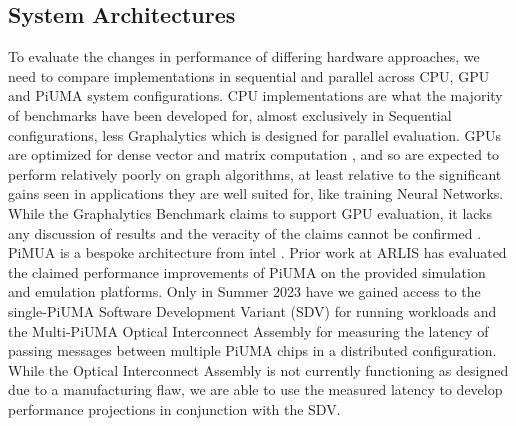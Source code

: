 \documentclass[letterpaper, 10pt]{article}
\begin{document}
\begin{multicols}{2}
{        \subsection{System Architectures}\label{section:architecutres}
        To evaluate the changes in performance of differing hardware approaches, we need to compare implementations in sequential and parallel across CPU, GPU and PiUMA system configurations. 
        CPU implementations are what the majority of benchmarks have been developed for, almost exclusively in Sequential configurations, less Graphalytics \cite{Capota2015} which is designed for parallel evaluation. 
        GPUs are optimized for dense vector and matrix computation \cite{Dally2021}, and so are expected to perform relatively poorly on graph algorithms, at least relative to the significant gains seen in applications they are well suited for, like training Neural Networks. While the Graphalytics Benchmark claims to support GPU evaluation, it lacks any discussion of results and the veracity of the claims cannot be confirmed \cite{Capota2015}.
        PiMUA is a bespoke architecture from intel \cite{Aananthakrishnan2020}. 
        Prior work at ARLIS has evaluated the claimed performance improvements of PiUMA on the provided simulation and emulation platforms. 
        Only in Summer 2023 have we gained access to the single-PiUMA Software Development Variant (SDV) for running workloads and the Multi-PiUMA Optical Interconnect Assembly for measuring the latency of passing messages between multiple PiUMA chips in a distributed configuration. 
        While the Optical Interconnect Assembly is not currently functioning as designed due to a manufacturing flaw, we are able to use the measured latency to develop performance projections in conjunction with the SDV. 
        
}
\end{multicols}
\end{document}
